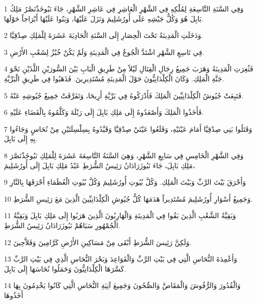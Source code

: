 \par 1 وَفِي السَّنَةِ التَّاسِعَةِ لِمُلْكِهِ فِي الشَّهْرِ الْعَاشِرِ فِي عَاشِرِ الشَّهْرِ، جَاءَ نَبُوخَذْنَصَّرُ مَلِكُ بَابِلَ هُوَ وَكُلُّ جَيْشِهِ عَلَى أُورُشَلِيمَ وَنَزَلَ عَلَيْهَا، وَبَنُوا عَلَيْهَا أَبْرَاجاً حَوْلَهَا.
\par 2 وَدَخَلَتِ الْمَدِينَةُ تَحْتَ الْحِصَارِ إِلَى السَّنَةِ الْحَادِيَةَ عَشَرَةَ لِلْمَلِكِ صِدْقِيَّا.
\par 3 فِي تَاسِعِ الشَّهْرِ اشْتَدَّ الْجُوعُ فِي الْمَدِينَةِ وَلَمْ يَكُنْ خُبْزٌ لِشَعْبِ الأَرْضِ.
\par 4 فَثُغِرَتِ الْمَدِينَةُ وَهَرَبَ جَمِيعُ رِجَالِ الْقِتَالِ لَيْلاً مِنْ طَرِيقِ الْبَابِ بَيْنَ السُّورَيْنِ اللَّذَيْنِ نَحْوَ جَنَّةِ الْمَلِكِ. وَكَانَ الْكِلْدَانِيُّونَ حَوْلَ الْمَدِينَةِ مُسْتَدِيرِينَ. فَذَهَبُوا فِي طَرِيقِ الْبَرِّيَّةِ.
\par 5 فَتَبِعَتْ جُيُوشُ الْكِلْدَانِيِّينَ الْمَلِكَ فَأَدْرَكُوهُ فِي بَرِّيَّةِ أَرِيحَا، وَتَفَرَّقَتْ جَمِيعُ جُيُوشِهِ عَنْهُ.
\par 6 فَأَخَذُوا الْمَلِكَ وَأَصْعَدُوهُ إِلَى مَلِكِ بَابِلَ إِلَى رَبْلَةَ وَكَلَّمُوهُ بِالْقَضَاءِ عَلَيْهِ.
\par 7 وَقَتَلُوا بَنِي صِدْقِيَّا أَمَامَ عَيْنَيْهِ، وَقَلَعُوا عَيْنَيْ صِدْقِيَّا وَقَيَّدُوهُ بِسِلْسِلَتَيْنِ مِنْ نُحَاسٍ وَجَاءُوا بِهِ إِلَى بَابِلَ.
\par 8 وَفِي الشَّهْرِ الْخَامِسِ فِي سَابِعِ الشَّهْرِ، وَهِيَ السَّنَةُ التَّاسِعَةَ عَشَرَةَ لِلْمَلِكِ نَبُوخَذْنَصَّرَ مَلِكِ بَابِلَ، جَاءَ نَبُوزَرَادَانُ رَئِيسُ الشُّرَطِ عَبْدُ مَلِكِ بَابِلَ إِلَى أُورُشَلِيمَ،
\par 9 وَأَحْرَقَ بَيْتَ الرَّبِّ وَبَيْتَ الْمَلِكِ. وَكُلَّ بُيُوتِ أُورُشَلِيمَ وَكُلَّ بُيُوتِ الْعُظَمَاءِ أَحْرَقَهَا بِالنَّارِ
\par 10 وَجَمِيعُ أَسْوَارِ أُورُشَلِيمَ مُسْتَدِيراً هَدَمَهَا كُلُّ جُيُوشِ الْكِلْدَانِيِّينَ الَّذِينَ مَعَ رَئِيسِ الشُّرَطِ.
\par 11 وَبَقِيَّةُ الشَّعْبِ الَّذِينَ بَقُوا فِي الْمَدِينَةِ وَالْهَارِبُونَ الَّذِينَ هَرَبُوا إِلَى مَلِكِ بَابِلَ وَبَقِيَّةُ الْجُمْهُورِ سَبَاهُمْ نَبُوزَرَادَانُ رَئِيسُ الشُّرَطِ.
\par 12 وَلَكِنَّ رَئِيسَ الشُّرَطِ أَبْقَى مِنْ مَسَاكِينِ الأَرْضِ كَرَّامِينَ وَفَلاَّحِينَ.
\par 13 وَأَعْمِدَةَ النُّحَاسِ الَّتِي فِي بَيْتِ الرَّبِّ وَالْقَوَاعِدَ وَبَحْرَ النُّحَاسِ الَّذِي فِي بَيْتِ الرَّبِّ كَسَّرَهَا الْكِلْدَانِيُّونَ وَحَمَلُوا نُحَاسَهَا إِلَى بَابِلَ.
\par 14 وَالْقُدُورَ وَالرُّفُوشَ وَالْمَقَاصَّ وَالصُّحُونَ وَجَمِيعَ آنِيَةِ النُّحَاسِ الَّتِي كَانُوا يَخْدِمُونَ بِهَا أَخَذُوهَا
